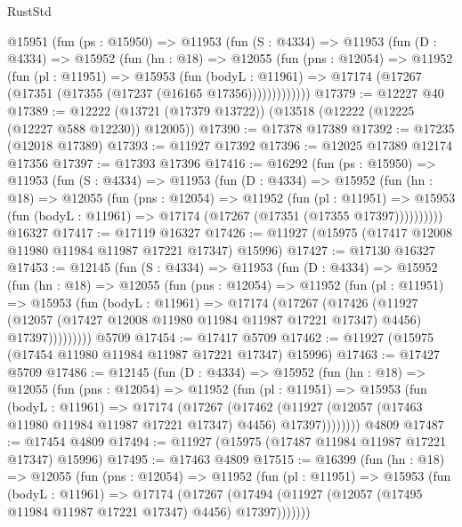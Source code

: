 \begin{lexlean}{RustStd}
\begin{coremodule}
    @15951
      (fun (ps : @15950) =>
      @11953
        (fun (S : @4334) =>
        @11953
          (fun (D : @4334) =>
          @15952
            (fun (hn : @18) =>
            @12055
              (fun (pns : @12054) =>
              @11952
                (fun (pl : @11951) =>
                @15953
                  (fun (bodyL : @11961) =>
                  @17174 (@17267 (@17351 (@17355 (@17237 (@16165 @17356)))))))))))))
@17379 := @12227 @40
@17389 := @12222 (@13721 (@17379 @13722)) (@13518 (@12222 (@12225 (@12227 @588 @12230)) @12005))
@17390 := @17378 @17389
@17392 := @17235 (@12018 @17389)
@17393 := @11927 @17392
@17396 := @12025 @17389 @12174 @17356
@17397 := @17393 @17396
@17416 := @16292
    (fun (ps : @15950) =>
    @11953
      (fun (S : @4334) =>
      @11953
        (fun (D : @4334) =>
        @15952
          (fun (hn : @18) =>
          @12055
            (fun (pns : @12054) =>
            @11952
              (fun (pl : @11951) =>
              @15953 (fun (bodyL : @11961) => @17174 (@17267 (@17351 (@17355 @17397))))))))))
    @16327
@17417 := @17119 @16327
@17426 := @11927 (@15975 (@17417 @12008 @11980 @11984 @11987 @17221 @17347) @15996)
@17427 := @17130 @16327
@17453 := @12145
    (fun (S : @4334) =>
    @11953
      (fun (D : @4334) =>
      @15952
        (fun (hn : @18) =>
        @12055
          (fun (pns : @12054) =>
          @11952
            (fun (pl : @11951) =>
            @15953
              (fun (bodyL : @11961) =>
              @17174
                (@17267
                  (@17426
                    (@11927
                      (@12057 (@17427 @12008 @11980 @11984 @11987 @17221 @17347) @4456)
                      @17397)))))))))
    @5709
@17454 := @17417 @5709
@17462 := @11927 (@15975 (@17454 @11980 @11984 @11987 @17221 @17347) @15996)
@17463 := @17427 @5709
@17486 := @12145
    (fun (D : @4334) =>
    @15952
      (fun (hn : @18) =>
      @12055
        (fun (pns : @12054) =>
        @11952
          (fun (pl : @11951) =>
          @15953
            (fun (bodyL : @11961) =>
            @17174
              (@17267
                (@17462
                  (@11927 (@12057 (@17463 @11980 @11984 @11987 @17221 @17347) @4456) @17397))))))))
    @4809
@17487 := @17454 @4809
@17494 := @11927 (@15975 (@17487 @11984 @11987 @17221 @17347) @15996)
@17495 := @17463 @4809
@17515 := @16399
    (fun (hn : @18) =>
    @12055
      (fun (pns : @12054) =>
      @11952
        (fun (pl : @11951) =>
        @15953
          (fun (bodyL : @11961) =>
          @17174
            (@17267
              (@17494 (@11927 (@12057 (@17495 @11984 @11987 @17221 @17347) @4456) @17397)))))))

\end{coremodule}
\end{lexlean}
